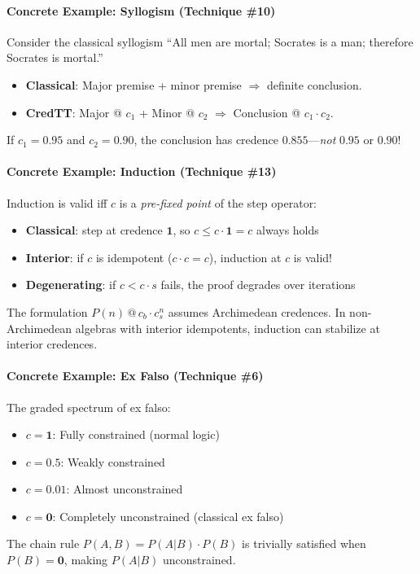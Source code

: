 \documentclass[11pt,a4paper]{article}
\makeatletter
\newcommand{\at}[1]{\,@\,#1}
\newcommand{\one}{\mathbf{1}}
\newcommand{\zero}{\mathbf{0}}
\makeatother
\begin{document}
\paragraph{Concrete Example: Syllogism (Technique \#10)}
Consider the classical syllogism ``All men are mortal; Socrates is a man; therefore Socrates is mortal.''
\begin{itemize}
    \item \textbf{Classical}: Major premise + minor premise $\Rightarrow$ definite conclusion.
    \item \textbf{CredTT}: Major @ $c_1$ + Minor @ $c_2$ $\Rightarrow$ Conclusion @ $c_1 \cdot c_2$.
\end{itemize}
If $c_1 = 0.95$ and $c_2 = 0.90$, the conclusion has credence $0.855$---\emph{not} $0.95$ or $0.90$!

\paragraph{Concrete Example: Induction (Technique \#13)}
Induction is valid iff $c$ is a \emph{pre-fixed point} of the step operator:
\begin{itemize}
    \item \textbf{Classical}: step at credence $\one$, so $c \leq c \cdot \one = c$ always holds
    \item \textbf{Interior}: if $c$ is idempotent ($c \cdot c = c$), induction at $c$ is valid!
    \item \textbf{Degenerating}: if $c < c \cdot s$ fails, the proof degrades over iterations
\end{itemize}
The formulation $P(n) \at{c_b \cdot c_s^n}$ assumes Archimedean credences. In non-Archimedean algebras with interior idempotents, induction can stabilize at interior credences.

\paragraph{Concrete Example: Ex Falso (Technique \#6)}
The graded spectrum of ex falso:
\begin{itemize}
    \item $c = \one$: Fully constrained (normal logic)
    \item $c = 0.5$: Weakly constrained
    \item $c = 0.01$: Almost unconstrained
    \item $c = \zero$: Completely unconstrained (classical ex falso)
\end{itemize}
The chain rule $P(A,B) = P(A|B) \cdot P(B)$ is trivially satisfied when $P(B) = \zero$, making $P(A|B)$ unconstrained.
\end{document}
